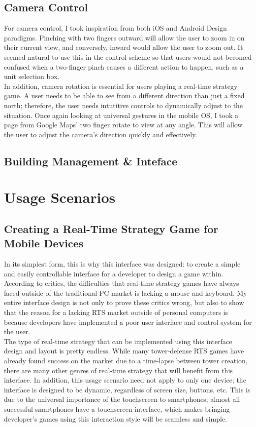 \documentclass[11pt]{article}
\begin{document}
	\subsection{Camera Control}
	For camera control, I took inspiration from both iOS and Android Design paradigms. Pinching with two fingers outward will allow the user to zoom in on their current view, and conversely, inward would allow the user to zoom out. It seemed natural to use this in the control scheme so that users would not becomed confused when a two-finger pinch causes a different action to happen, such as a unit selection box. \\
	In addition, camera rotation is essential for users playing a real-time strategy game. A user needs to be able to see from a different direction than just a fixed north; therefore, the user needs intutitive controls to dynamically adjust to the situation. Once again looking at universal gestures in the mobile OS, I took a page from Google Maps' two finger rotate to view at any angle. This will allow the user to adjust the camera's direction quickly and effectively.
	\subsection{Building Management \& Inteface}

\section{Usage Scenarios}
	\subsection{Creating a Real-Time Strategy Game for Mobile Devices}
	In its simplest form, this is why this interface was designed: to create a simple and easily controllable interface for a developer to design a game within. According to critics, the difficulties that real-time strategy games have always faced outside of the traditional PC market is lacking a mouse and keyboard. My entire interface design is not only to prove these critics wrong, but also to show that the reason for a lacking RTS market outside of personal computers is because developers have implemented a poor user interface and control system for the user. \\
	The type of real-time strategy that can be implemented using this interface design and layout is pretty endless. While many tower-defense RTS games have already found success on the market due to a time-lapse between tower creation, there are many other genres of real-time strategy that will benefit from this interface. In addition, this usage scenario need not apply to only one device; the interface is designed to be dynamic, regardless of screen size, buttons, etc. This is due to the universal importance of the touchscreen to smartphones; almost all successful smartphones have a touchscreen interface, which makes bringing developer's games using this interaction style will be seamless and simple.
\end{document}
